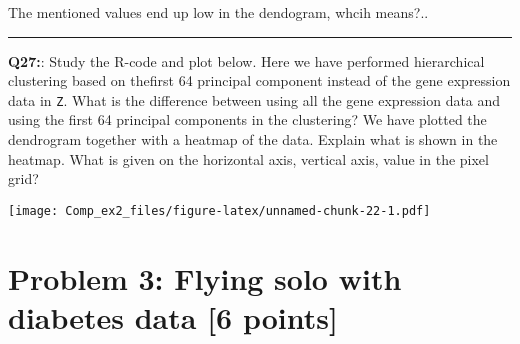 \documentclass[]{article}
\newenvironment{Shaded}{\begin{snugshade}}{\end{snugshade}}
\newcommand{\KeywordTok}[1]{\textcolor[rgb]{0.13,0.29,0.53}{\textbf{#1}}}
\newcommand{\DataTypeTok}[1]{\textcolor[rgb]{0.13,0.29,0.53}{#1}}
\newcommand{\DecValTok}[1]{\textcolor[rgb]{0.00,0.00,0.81}{#1}}
\newcommand{\StringTok}[1]{\textcolor[rgb]{0.31,0.60,0.02}{#1}}
\newcommand{\OtherTok}[1]{\textcolor[rgb]{0.56,0.35,0.01}{#1}}
\newcommand{\OperatorTok}[1]{\textcolor[rgb]{0.81,0.36,0.00}{\textbf{#1}}}
\newcommand{\NormalTok}[1]{#1}
\begin{document}
The mentioned values end up low in the dendogram, whcih means?..

\begin{center}\rule{0.5\linewidth}{\linethickness}\end{center}

\textbf{Q27:}: Study the R-code and plot below. Here we have performed
hierarchical clustering based on thefirst 64 principal component instead
of the gene expression data in \texttt{Z}. What is the difference
between using all the gene expression data and using the first 64
principal components in the clustering? We have plotted the dendrogram
together with a heatmap of the data. Explain what is shown in the
heatmap. What is given on the horizontal axis, vertical axis, value in
the pixel grid?

\begin{Shaded}
\end{Shaded}

\texttt{[image: Comp\_ex2\_files/figure-latex/unnamed-chunk-22-1.pdf]}

\section{Problem 3: Flying solo with diabetes data {[}6
points{]}}\label{problem-3-flying-solo-with-diabetes-data-6-points}

\begin{Shaded}
\end{Shaded}
\end{document}
